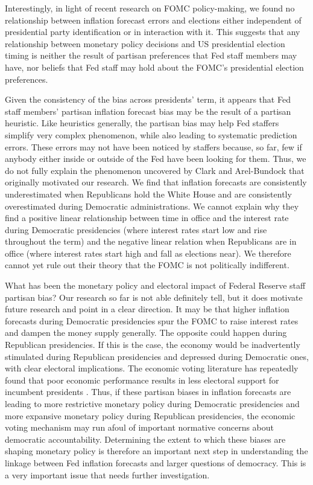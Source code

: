\documentclass[a4paper]{article}\usepackage{graphicx, color}
\begin{document}
Interestingly, in light of recent research on FOMC policy-making, we found no relationship between inflation forecast errors and elections either independent of presidential party identification or in interaction with it. This suggests that any relationship between monetary policy decisions and US presidential election timing is neither the result of partisan preferences that Fed staff members may have, nor beliefs that Fed staff may hold about the FOMC's presidential election preferences. 

Given the consistency of the bias across presidents' term, it appears that Fed staff members' partisan inflation forecast bias may be the result of a partisan heuristic. Like heuristics generally, the partisan bias may help Fed staffers simplify very complex phenomenon, while also leading to systematic prediction errors. These errors may not have been noticed by staffers because, so far, few if anybody either inside or outside of the Fed have been looking for them. Thus, we do not fully explain the phenomenon uncovered by Clark and Arel-Bundock that originally motivated our research. We find that inflation forecasts are consistently underestimated when Republicans hold the White House and are consistently overestimated during Democratic administrations. We cannot explain why they find a positive linear relationship between time in office and the interest rate during Democratic presidencies (where interest rates start low and rise throughout the term) and the negative linear relation when Republicans are in office (where interest rates start high and fall as elections near). We therefore cannot yet rule out their theory that the FOMC is not politically indifferent.

What has been the monetary policy and electoral impact of Federal Reserve staff partisan bias? Our research so far is not able definitely tell, but it does motivate future research and point in a clear direction. It may be that higher inflation forecasts during Democratic presidencies spur the FOMC to raise interest rates and dampen the money supply generally. The opposite could happen during Republican presidencies. If this is the case, the economy would be inadvertently stimulated during Republican presidencies and depressed during Democratic ones, with clear electoral implications. The economic voting literature has repeatedly found that poor economic performance results in less electoral support for incumbent presidents \citep[e.g.][]{Alvarez1998, Bloom1975, LewisBeck1988, Powell1993}. Thus, if these partisan biases in inflation forecasts are leading to more restrictive monetary policy during Democratic presidencies and more expansive monetary policy during Republican presidencies, the economic voting mechanism may run afoul of important normative concerns about democratic accountability. Determining the extent to which these biases are shaping monetary policy is therefore an important next step in understanding the linkage between Fed inflation forecasts and larger questions of democracy. This is a very important issue that needs further investigation.
\end{document}
